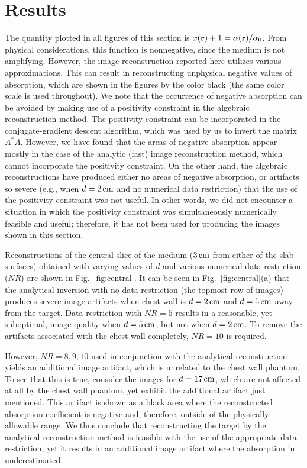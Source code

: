 \section{Results}
\label{sec:3_results}

The quantity plotted in all figures of this section is $x({\bf r}) + 1 = \alpha({\bf r}) / \alpha_0$. From physical considerations, this function is nonnegative, since the medium is not amplifying.  However,
the image reconstruction reported here utilizes various approximations. This can result in reconstructing unphysical negative values of absorption, which are shown in the figures by the color black (the same color scale is used throughout). We note that the occurrence of negative absorption can be avoided by making use of a positivity constraint in the algebraic reconstruction method. The positivity constraint can be incorporated in the conjugate-gradient descent algorithm, which was used by us to invert the matrix $A^*A$. However, we have found that the areas of negative absorption appear mostly in the case of the analytic (fast) image reconstruction method, which cannot incorporate the positivity constraint. On the other hand, the algebraic reconstructions have produced either no areas of negative absorption, or artifacts so severe (e.g., when $d=2\,{\rm cm}$ and no numerical data restriction) that the use of the
positivity constraint was not useful. In other words, we did not encounter a situation in which the positivity constraint was simultaneously numerically feasible and useful; therefore, it has not been used for producing the images shown in this section.

Reconstructions of the central slice of the medium ($3\,{\rm cm}$ from either of the slab surfaces) obtained with varying values of $d$ and various numerical data restriction ($NR$) are shown in Fig.~\ref{fig:central}. It can be seen in Fig.~\ref{fig:central}(a) that the analytical inversion with no data restriction (the topmost row of images) produces severe image artifacts when chest wall is
$d=2\,{\rm cm}$ and $d=5\,{\rm cm}$ away from the target. Data restriction with $NR=5$ results in a reasonable, yet suboptimal, image quality when $d=5\,{\rm cm}$, but not when $d=2\,{\rm cm}$. To remove
the artifacts associated with the chest wall completely, $NR=10$ is required.

However, $NR = 8,9,10$ used in conjunction with the analytical reconstruction yields an additional image artifact, which is unrelated to the chest wall phantom. To see that this is true, consider the
images for $d=17\,{\rm cm}$, which are not affected at all by the chest wall phantom, yet exhibit the additional artifact just mentioned. This artifact is shown as a black area where the
reconstructed absorption coefficient is negative and, therefore, outside of the physically-allowable range. We thus conclude that reconstructing the target by the analytical reconstruction method is
feasible with the use of the appropriate data restriction, yet it results in an additional image artifact where the absorption in underestimated. 

